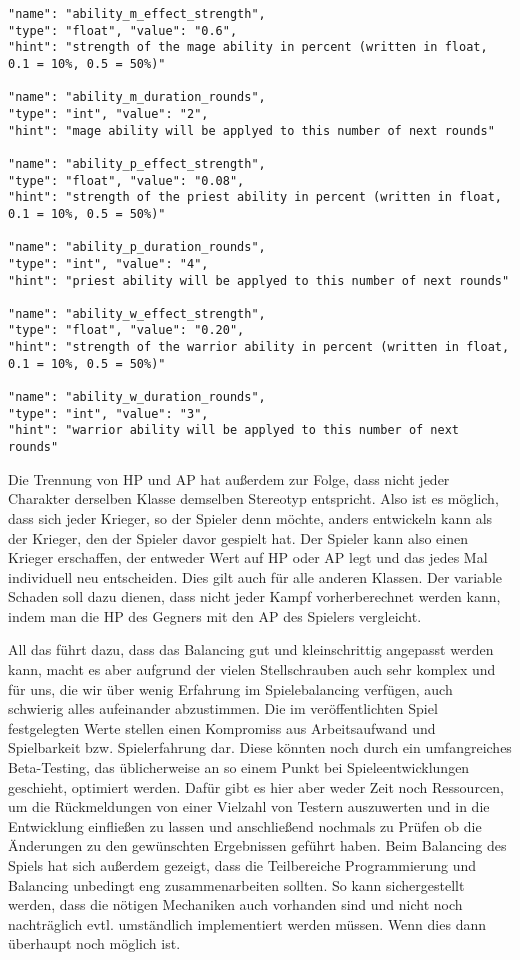 \begin{lstlisting}
"name": "ability_m_effect_strength",
"type": "float", "value": "0.6",
"hint": "strength of the mage ability in percent (written in float, 0.1 = 10%, 0.5 = 50%)"

"name": "ability_m_duration_rounds",
"type": "int", "value": "2",
"hint": "mage ability will be applyed to this number of next rounds"

"name": "ability_p_effect_strength",
"type": "float", "value": "0.08",
"hint": "strength of the priest ability in percent (written in float, 0.1 = 10%, 0.5 = 50%)"

"name": "ability_p_duration_rounds",
"type": "int", "value": "4",
"hint": "priest ability will be applyed to this number of next rounds"

"name": "ability_w_effect_strength",
"type": "float", "value": "0.20",
"hint": "strength of the warrior ability in percent (written in float, 0.1 = 10%, 0.5 = 50%)"

"name": "ability_w_duration_rounds",
"type": "int", "value": "3",
"hint": "warrior ability will be applyed to this number of next rounds"
\end{lstlisting}

Die Trennung von HP und AP hat außerdem zur Folge, dass nicht jeder Charakter derselben Klasse demselben Stereotyp entspricht. Also ist es möglich, dass sich jeder Krieger, so der Spieler denn möchte, anders entwickeln kann als der Krieger, den der Spieler davor gespielt hat. Der Spieler kann also einen Krieger erschaffen, der entweder Wert auf HP oder AP legt und das jedes Mal individuell neu entscheiden. Dies gilt auch für alle anderen Klassen. Der variable Schaden soll dazu dienen, dass nicht jeder Kampf vorherberechnet werden kann, indem man die HP des Gegners mit den AP des Spielers vergleicht.

All das führt dazu, dass das Balancing gut und kleinschrittig angepasst werden kann, macht es aber aufgrund der vielen Stellschrauben auch sehr komplex und für uns, die wir über wenig Erfahrung im Spielebalancing verfügen, auch schwierig alles aufeinander abzustimmen. Die im veröffentlichten Spiel festgelegten Werte stellen einen Kompromiss aus Arbeitsaufwand und Spielbarkeit bzw. Spielerfahrung dar. Diese könnten noch durch ein umfangreiches Beta-Testing, das üblicherweise an so einem Punkt bei Spieleentwicklungen geschieht, optimiert werden. Dafür gibt es hier aber weder Zeit noch Ressourcen, um die Rückmeldungen von einer Vielzahl von Testern auszuwerten und in die Entwicklung einfließen zu lassen und anschließend nochmals zu Prüfen ob die Änderungen zu den gewünschten Ergebnissen geführt haben. Beim Balancing des Spiels hat sich außerdem gezeigt, dass die Teilbereiche Programmierung und Balancing unbedingt eng zusammenarbeiten sollten. So kann sichergestellt werden, dass die nötigen Mechaniken auch vorhanden sind und nicht noch nachträglich evtl. umständlich implementiert werden müssen. Wenn dies dann überhaupt noch möglich ist.

